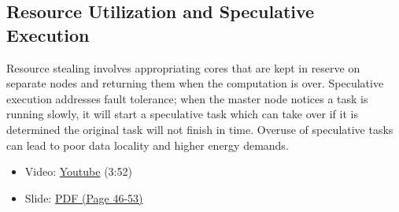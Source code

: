 \subsection{Resource Utilization and Speculative
Execution}\label{resource-utilization-and-speculative-execution}

Resource stealing involves appropriating cores that are kept in reserve
on separate nodes and returning them when the computation is over.
Speculative execution addresses fault tolerance; when the master node
notices a task is running slowly, it will start a speculative task which
can take over if it is determined the original task will not finish in
time. Overuse of speculative tasks can lead to poor data locality and
higher energy demands.

\begin{itemize}
\tightlist
\item
  Video: \href{https://www.youtube.com/watch?v=wWyFiqDIYus}{Youtube}
  (3:52)
\end{itemize}

\begin{itemize}
\tightlist
\item
  Slide:
  \href{https://drive.google.com/open?id=0B88HKpainTSfT28zLTdKYWhGdGM}{PDF
  (Page 46-53)}
\end{itemize}
